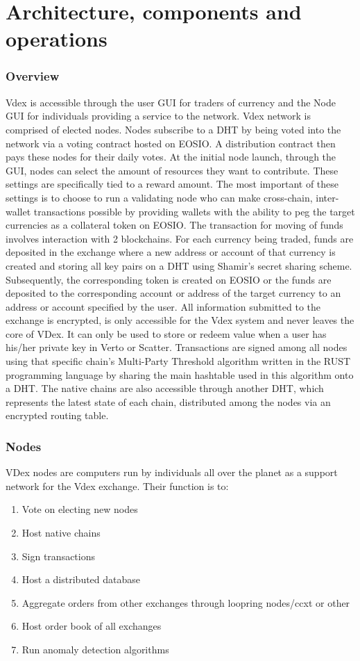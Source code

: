 \documentclass[]{article}
\begin{document}
{									
\section{Architecture, components and operations}
	
	\subsubsection{Overview}
	Vdex is accessible through the user GUI for traders of currency and the Node GUI for individuals providing a service to the network.     Vdex network is comprised of elected nodes.
	Nodes subscribe to a DHT 
	by being voted into the network via a voting contract hosted on EOSIO. 
	A distribution contract then pays these nodes for their daily votes.
	At the initial node launch, through the GUI, nodes can select the amount of resources they want to contribute.
	These settings are specifically tied to a reward amount.
	The most important of these settings is to choose to run a validating node who can make cross-chain, inter-wallet transactions possible by providing wallets with the ability to peg the target currencies as a collateral token on EOSIO. 
	The transaction for moving of funds involves interaction with 2 blockchains. 
	For each currency being traded, funds are deposited in the exchange where a new address or account of that currency is created and storing all key pairs on a DHT using Shamir's secret sharing scheme. \cite{29}Subsequently, the corresponding token is created on EOSIO or the funds are deposited to the corresponding account or address of the target currency to an address or account specified by the user.
	All information submitted to the exchange is encrypted, is only accessible for the Vdex system  and never leaves the core of VDex. It can only be used to store or redeem value when a user has his/her private key in Verto or Scatter.
	Transactions are signed among all nodes using that specific chain's Multi-Party Threshold algorithm  \cite{26}  written in the RUST  programming language by sharing the main hashtable used in this algorithm onto a DHT. 
	The native chains are also accessible through another DHT, which represents the latest state of each chain, distributed among the nodes via an encrypted routing table.\cite{27} \cite{28}
	 
\subsubsection{Nodes}
VDex nodes are computers run by individuals all over the planet as a support network for the Vdex exchange. 
Their function is to:\
\begin{enumerate}
	\item Vote on electing new nodes
	\item Host native chains
	\item Sign transactions
	\item Host a distributed database
	\item Aggregate orders from other exchanges through loopring nodes/ccxt or other 
	\item Host order book of all exchanges
	\item Run anomaly detection algorithms


\end{enumerate}}
\end{document}
